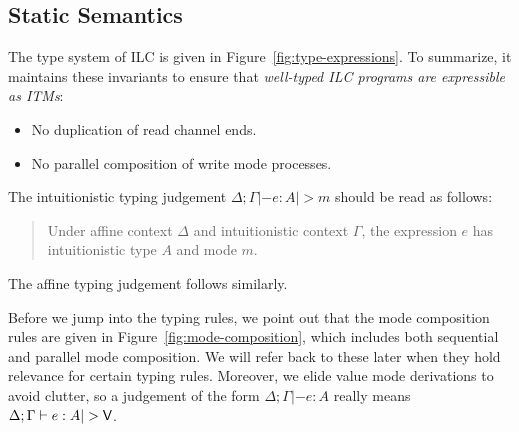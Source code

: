 %  

\subsection{Static Semantics}
\label{subsec:types}

%





The type system of ILC is given in Figure~\ref{fig:type-expressions}. To
summarize, it maintains these invariants to ensure that \emph{well-typed ILC
  programs are expressible as ITMs}:
\begin{itemize}[leftmargin=*]
  \item No duplication of read channel ends.
  \item No parallel composition of write mode processes.
\end{itemize}

The intuitionistic typing judgement $\Delta ; \Gamma |- e : A |> m$ should be read as
follows:
\begingroup
\addtolength\leftmargini{-.2in}
\begin{quote}
  Under affine context $\Delta$ and intuitionistic context $\Gamma$, the expression $e$
  has intuitionistic type $A$ and mode $m$.
\end{quote}
\endgroup
\noindent The affine typing judgement follows similarly.

Before we jump into the typing rules, we point out that the mode composition
rules are given in Figure~\ref{fig:mode-composition}, which includes both
sequential and parallel mode composition. We will refer back to these later when
they hold relevance for certain typing rules. Moreover, we elide value mode
derivations to avoid clutter, so a judgement of the form $\Delta ; \Gamma |- e : A$ really
means $\Delta ; \Gamma |- e : A |> \Vm$.

